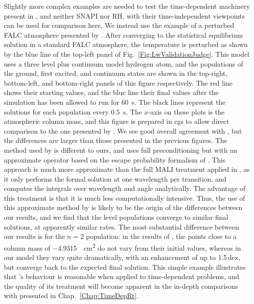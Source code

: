 Slightly more complex examples are needed to test the time-dependent machinery present in \Lw{}, and neither SNAPI nor RH, with their time-independent viewpoints can be used for comparison here.
We instead use the example of a perturbed FALC atmosphere presented by \citet{Judge2017}.
After converging to the statistical equilibrium solution in a standard FALC atmosphere, the temperature is perturbed as shown by the blue line of the top-left panel of Fig.~\ref{Fig:LwValidationJudge}.
This model uses a three level plus continuum model hydrogen atom, and the populations of the ground, first excited, and continuum states are shown in the top-right, bottom-left, and bottom-right panels of this figure respectively.
The red line shows their starting values, and the blue line their final values after the simulation has been allowed to run for \SI{60}{\second}.
The black lines represent the solutions for each population every \SI{0.5}{\second}.
The $x$-axis on these plots is the atmospheric column mass, and this figure is prepared in cgs to  allow direct comparison to the one presented by \citet{Judge2017}.
We see good overall agreement with \citet{Judge2017}, but the differences are larger than those presented in the previous figures.
The method used by \citet{Judge2017} is different to ours, and uses full preconditioning but with an approximate operator based on the escape probability formalism of \citet{Hummer1982}.
This approach is much more approximate than the full MALI treatment applied in \Lw{}, as it only performs the formal solution at one wavelength per transition, and computes the integrals over wavelength and angle analytically.
The advantage of this treatment is that it is much less computationally intensive.
Thus, the use of this approximate method by \citet{Judge2017} is likely to be the origin of the differences between our results, and we find that the level populations converge to similar final solutions, at apparently similar rates.
The most substantial difference between our results is for the $n=2$ population: in the results of \citet{Judge2017}, the points close to a column mass of \SI{-4.9315}{\per\square\centi\metre} do not vary from their initial values, whereas in our model they vary quite dramatically, with an enhancement of up to 1.5\,dex, but converge back to the expected final solution.
This simple example illustrates that \Lw{}'s behaviour is reasonable when applied to time-dependent problems, and the quality of its treatment will become apparent in the in-depth comparisons with \Radyn{} presented in Chap.~\ref{Chap:TimeDepRt}.

